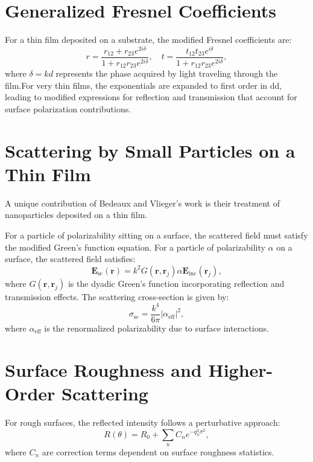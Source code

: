 \documentclass{article}
\begin{document}
	\section{Generalized Fresnel Coefficients}
	For a thin film deposited on a substrate, the modified Fresnel coefficients are:
	\begin{equation}
		r = \frac{r_{12} + r_{23} e^{2i\delta}}{1 + r_{12}r_{23} e^{2i\delta}}, \quad
		t = \frac{t_{12} t_{23} e^{i\delta}}{1 + r_{12}r_{23} e^{2i\delta}},
	\end{equation} 
	where $\delta = k d$ represents the phase acquired by light traveling through the film.For very thin films, the exponentials are expanded to first order in dd, leading to modified expressions for reflection and transmission that account for surface polarization contributions.
	
	\section{Scattering by Small Particles on a Thin Film}
	A unique contribution of Bedeaux and Vlieger's work is their treatment of nanoparticles deposited on a thin film.
	
	For a particle of polarizability  sitting on a surface, the scattered field must satisfy the modified Green’s function equation.	For a particle of polarizability $\alpha$ on a surface, the scattered field satisfies:
	\begin{equation}
		\mathbf{E}_{\text{sc}}(\mathbf{r}) = k^2 G(\mathbf{r}, \mathbf{r}_j) \alpha \mathbf{E}_{\text{inc}}(\mathbf{r}_j),
	\end{equation}
	where $G(\mathbf{r}, \mathbf{r}_j)$ is the dyadic Green’s function incorporating reflection and transmission effects. The scattering cross-section is given by:
	\begin{equation}
		\sigma_{\text{sc}} = \frac{k^4}{6\pi} |\alpha_{\text{eff}}|^2,
	\end{equation}
	where $\alpha_{\text{eff}}$ is the renormalized polarizability due to surface interactions.
	
	\section{Surface Roughness and Higher-Order Scattering}
	For rough surfaces, the reflected intensity follows a perturbative approach:
	\begin{equation}
		R(\theta) = R_0 + \sum_n C_n e^{-q_n^2 \sigma^2},
	\end{equation}
	where $C_n$ are correction terms dependent on surface roughness statistics.
	
\end{document}
